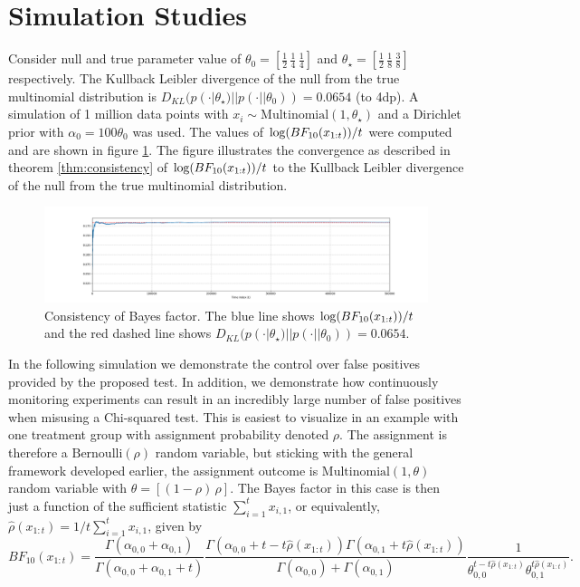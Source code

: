 \documentclass[11pt]{article}
\def\log{{\rm log}}
\begin{document}
\section{Simulation Studies}
\label{sec:simulation}
Consider null and true parameter value of $\theta_0=[\frac{1}{2}\, \frac{1}{4}\, \frac{1}{4}]$ and $\theta_\star=[\frac{1}{2}\, \frac{1}{8}\, \frac{3}{8}]$ respectively.
The Kullback Leibler divergence of the null from the true multinomial distribution is $D_{KL}(p(\cdot|\theta_\star)||p(\cdot||\theta_0)) = 0.0654$ (to 4dp).
A simulation of 1 million data points with $x_i \sim \text{Multinomial}(1, \theta_\star)$ and a Dirichlet prior with $\alpha_0 = 100\theta_0$ was used.
The values of $\log(BF_{10}(x_{1:t}))/t$ were computed and are shown in figure \ref{fig:lbf}.
The figure illustrates the convergence as described in theorem \ref{thm:consistency} of $\log(BF_{10}(x_{1:t}))/t$ to the Kullback Leibler divergence of the null from the true multinomial distribution.
\begin{figure}[H]
  \centering
  \includegraphics[scale=0.35]{images/consistency.png}
  \caption{Consistency of Bayes factor.
The blue line shows $\log(BF_{10}(x_{1:t}))/t$ and the red dashed line shows $D_{KL}(p(\cdot|\theta_\star)||p(\cdot||\theta_0)) = 0.0654$.}
    \label{fig:lbf}
  \end{figure}
  In the following simulation we demonstrate the control over false positives provided by the proposed test.
In addition, we demonstrate how continuously monitoring experiments can result in an incredibly large number of false positives when misusing a Chi-squared test.
This is easiest to visualize in an example with one treatment group with assignment probability denoted $\rho$.
The assignment is therefore a $\text{Bernoulli}(\rho)$ random variable, but sticking with the general framework developed earlier, the assignment outcome is $\text{Multinomial}(1,\theta)$ random variable with $\theta = [(1-\rho)\, \rho]$.
The Bayes factor in this case is then just a function of the sufficient statistic $\sum_{i=1}^t x_{i,1}$, or equivalently, $\hat{\rho}(x_{1:t}) = 1/t \sum_{i=1}^{t} x_{i,1}$, given by
\begin{equation}
  \label{eq:bayes_factor}
 BF_{10}(x_{1:t})  = \frac{\Gamma(\alpha_{0,0}+\alpha_{0,1})}{\Gamma(\alpha_{0,0}+\alpha_{0,1}+t)}\frac{\Gamma(\alpha_{0,0} + t-t\hat{\rho}(x_{1:t} ))\Gamma(\alpha_{0,1} + t\hat{\rho}(x_{1:t} )) }{\Gamma(\alpha_{0,0} )+\Gamma(\alpha_{0,1} )}\frac{1}{\theta_{0,0}^{t-t\hat{\rho}(x_{1:t})}\theta_{0,1}^{t\hat{\rho}(x_{1:t})}}.
\end{equation}
\end{document}
